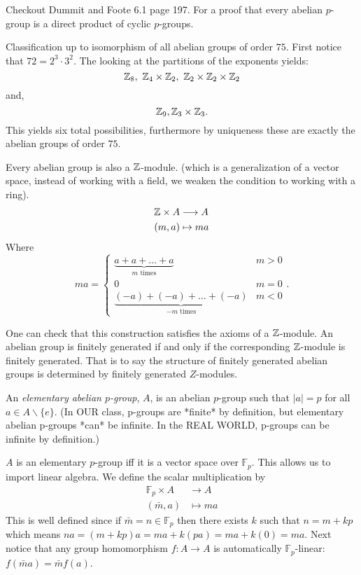 \documentclass[11pt,leqno,oneside]{amsart}
\newcommand{\Fp}{{\mathbb{F}_p}} %
\begin{document}
\begin{rmk*}
  Checkout Dummit and Foote 6.1 page
  197. For a proof that every abelian
  \(p\)-group is a direct product of
  cyclic \(p\)-groups.
\end{rmk*}

\begin{example*}
  Classification up to isomorphism of
  all abelian groups of order
  \(75\). First notice that
  \(72=2^3 \cdot 3^2\). The looking at
  the partitions of the exponents
  yields:
  \[{\mathbb Z}_8,\ {\mathbb Z}_4 \times {\mathbb Z}_2,\ {\mathbb Z}_2
    \times {\mathbb Z}_2 \times {\mathbb Z}_2\] and,
  \[{\mathbb Z}_9, {\mathbb Z}_3 \times {\mathbb Z}_3.\]
  This yields six total possibilities,
  furthermore by uniqueness these are
  exactly the abelian groups of order
  \(75\).
\end{example*}

\begin{rmk*}[1.2.11]
  Every abelian group is also a
  \({\mathbb Z}\)-module. (which is a
  generalization of a vector space,
  instead of working with a field, we
  weaken the condition to working with a
  ring).
  \begin{align*}
    {\mathbb Z} \times A &\longrightarrow A\\
    (m,a)& \mapsto ma
  \end{align*}
  Where
  \[ma =
    \begin{cases}
      \underbrace{a+a+\ldots+a}_{m \text{ times}} & m > 0\\
      0 & m=0\\
      \underbrace{(-a)+(-a)+\ldots+(-a)}_{-m
        \text{ times}} & m < 0
    \end{cases}.
  \]
\end{rmk*}
One can check that this construction
satisfies the axioms of a
\({\mathbb Z}\)-module. An abelian group is
finitely generated if and only if the
corresponding \({\mathbb Z}\)-module is finitely
generated. That is to say the structure
of finitely generated abelian groups is
determined by finitely generated
\(Z\)-modules.

\begin{defn*}[1.2.12]
  An \emph{elementary abelian $p$-group}, $A$, is an abelian $p$-group such that
  \(|a|=p\) for all \(a \in A \smallsetminus \{e\}\).  (In OUR class, p-groups are *finite* by definition, but elementary abelian p-groups *can* be infinite.  In the REAL WORLD, p-groups can be infinite by definition.)
\end{defn*}

\begin{rmk*}[1.2.13]
  $A$ is an elementary \(p\)-group iff it
  is a vector space over
  \(\Fp\). This allows us to import
  linear algebra. We define the scalar
  multiplication by
  \begin{align*}
    \Fp \times A &\longrightarrow A\\
    (\bar{m},a) &\longmapsto ma
  \end{align*}
  This is well defined since if
  \(\bar{m} = n \in \Fp\) then there
  exists \(k\) such that \(n=m+kp\)
  which means
  \(na=(m+kp)a=ma+k(pa)=ma+k(0)=ma\). Next
  notice that any group homomorphism
  \(f \colon A \to A\) is automatically
  \(\Fp\)-linear:
  \(f(\bar{m}a)=\bar{m}f(a)\).
\end{rmk*}
\end{document}
